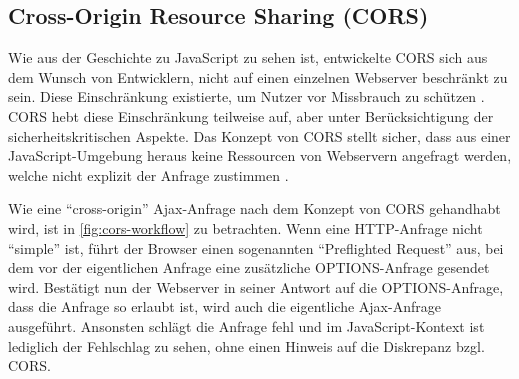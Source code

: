 
%


\subsection{Cross-Origin Resource Sharing (CORS)}

Wie aus der Geschichte zu JavaScript zu sehen ist, entwickelte CORS sich aus dem Wunsch von Entwicklern, nicht auf einen einzelnen Webserver beschränkt zu sein. Diese Einschränkung existierte, um Nutzer vor Missbrauch zu schützen \cite{BrowserProtectionAgainstCSRF}. CORS hebt diese Einschränkung teilweise auf, aber unter Berücksichtigung der sicherheitskritischen Aspekte. Das Konzept von CORS stellt sicher, dass aus einer JavaScript-Umgebung heraus keine Ressourcen von Webservern angefragt werden, welche nicht explizit der Anfrage zustimmen \cite{MDNCORS}.

Wie eine \enquote{cross-origin} Ajax-Anfrage nach dem Konzept von CORS gehandhabt wird, ist in \autoref{fig:cors-workflow} zu betrachten. Wenn eine HTTP-Anfrage nicht \enquote{simple}\footnotemark{} ist, führt der Browser einen sogenannten \enquote{Preflighted Request} aus, bei dem vor der eigentlichen Anfrage eine zusätzliche OPTIONS-Anfrage gesendet wird. Bestätigt nun der Webserver in seiner Antwort auf die OPTIONS-Anfrage, dass die Anfrage so erlaubt ist, wird auch die eigentliche Ajax-Anfrage ausgeführt. Ansonsten schlägt die Anfrage fehl und im JavaScript-Kontext ist lediglich der Fehlschlag zu sehen, ohne einen Hinweis auf die Diskrepanz bzgl. CORS.


